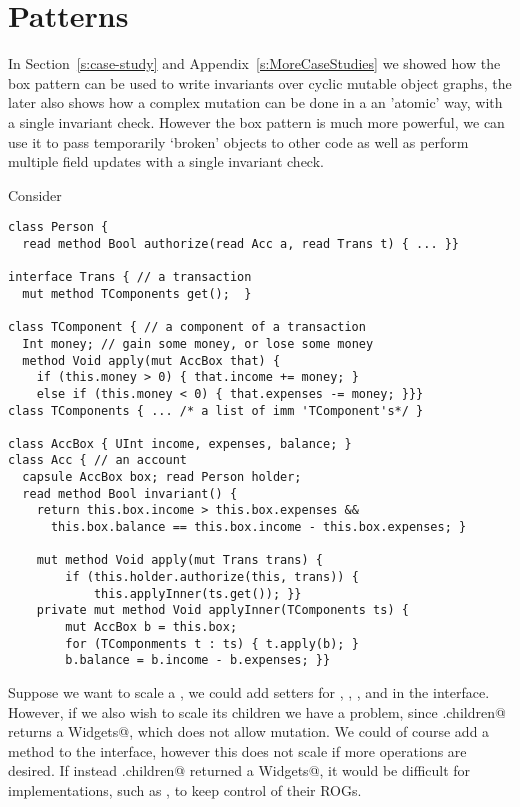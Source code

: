 \section{Patterns}
\label{s:patterns}

In Section~\ref{s:case-study} and Appendix~\ref{s:MoreCaseStudies} we showed how the box pattern can be used to write invariants over cyclic mutable object graphs, the later also shows how a complex mutation can be done in a an 'atomic' way, with a single invariant check. However the box pattern is much more powerful, we can use it to pass temporarily `broken' objects to other code as well as perform multiple field updates with a single invariant check.

Consider

\begin{lstlisting}
class Person {
  read method Bool authorize(read Acc a, read Trans t) { ... }}

interface Trans { // a transaction
  mut method TComponents get();  }

class TComponent { // a component of a transaction
  Int money; // gain some money, or lose some money
  method Void apply(mut AccBox that) {
    if (this.money > 0) { that.income += money; }
    else if (this.money < 0) { that.expenses -= money; }}}
class TComponents { ... /* a list of imm 'TComponent's*/ }
	
class AccBox { UInt income, expenses, balance; }
class Acc { // an account
  capsule AccBox box; read Person holder;
  read method Bool invariant() {
    return this.box.income > this.box.expenses &&
      this.box.balance == this.box.income - this.box.expenses; }
    
    mut method Void apply(mut Trans trans) {
        if (this.holder.authorize(this, trans)) {
            this.applyInner(ts.get()); }}
    private mut method Void applyInner(TComponents ts) {
        mut AccBox b = this.box;
        for (TComponments t : ts) { t.apply(b); }
        b.balance = b.income - b.expenses; }}
\end{lstlisting}

Suppose we want to scale a \Q@Widget@, we could add \Q@mut@ setters for \Q@width@, \Q@height@, \Q@left@, and \Q@top@ in the \Q@Widget@ interface. However, if we also wish to scale its children we have a problem, since \Q@Widget.children@ returns a \Q@read Widgets@, which does not allow mutation. We could of course add a \Q@mut@ method \Q@zoom@ to the \Q@Widget@ interface, however this does not scale if more operations are desired. If instead \Q@Widget.children@ returned a \Q@mut Widgets@, it would be difficult for \Q@Widget@ implementations, such as \Q@SafeMovable@, to keep control of their ROGs.

